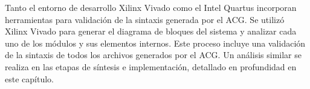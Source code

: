 	Tanto el entorno de desarrollo Xilinx Vivado como el Intel Quartus incorporan herramientas para validación de la sintaxis generada por el ACG. Se utilizó Xilinx Vivado para generar el diagrama de bloques del sistema y analizar cada uno de los módulos y sus elementos internos. Este proceso incluye una validación de la sintaxis de todos los archivos generados por el ACG. Un análisis similar se realiza en las etapas de síntesis e implementación, detallado en profundidad en este capítulo.
	
